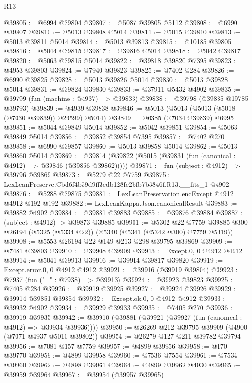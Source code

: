 \begin{lexlean}{R13}
\begin{coremodule}
@39805 := @6994 @39804
@39807 := @5087 @39805 @5112
@39808 := @6990 @39807
@39810 := @5013 @39808 @5014
@39811 := @5015 @39810
@39813 := @5013 @39811 @5014
@39814 := @5013 @39813
@39815 := @10185 @39805
@39816 := @5044 @39815
@39817 := @39816 @5014
@39818 := @5042 @39817
@39820 := @5063 @39815 @5014
@39822 := @39818 @39820 @7395
@39823 := @4953 @39803
@39824 := @7940 @39823
@39825 := @7402 @284
@39826 := @6990 @39825
@39828 := @5013 @39826 @5014
@39830 := @5013 @39828 @5014
@39831 := @39824 @39830
@39833 := @37911 @5432 @4902
@39835 := @39799 (fun (machine : @4937) => @39833)
@39838 := @39798 (@39835 @19785 @39793)
@39839 := @4939 @39838
@39846 := @5013 (@5013 (@5013 (@5018 (@7030 @39839)) @26599) @5014)
@39849 := @6385 (@7034 @39839) @6995
@39851 := @5044 @39849 @5014
@39852 := @5042 @39851
@39854 := @5063 @39849 @5014
@39856 := @39852 @39854 @7395
@39857 := @7402 @270
@39858 := @6990 @39857
@39860 := @5013 @39858 @5014
@39862 := @5013 @39860 @5014
@39869 := @39814 (@39822 (@5015 (@39831 (fun (canonical : @4912) => @39846 (@39856 @39862)))))
@39871 := fun (subject : @4912) => @39796 @39869
@39873 := @5279 @22 @7759
@39875 := LexLeanPreserve.Cbd6f4b39d9ff3edb128fe2bfb7b3846f.R13.__fits_1 @4902
@39876 := @5288 @39875
@39881 := LexLeanPreservation.encExcept @4912 @4912 @192 @192
@39882 := LexLeanKappa.Json.canonicalResult
@39883 := @39882 @4902
@39884 := @39881 @39883
@39885 := @39876 @39884
@39887 := (subject : @4912) -> @39873 @39885
@39901 := @5302
    @22
    @7759
    @39885
    @300
    @26194
    (@5325 (@5334 @22))
    (@5340 (@5341 (@5342 @300) @7759 @5319))
@39908 := @5553 @26194 @22 @149 @213 @298 @39795 @39869
@39909 := @7481 @39803
@39910 := @39908 @39909
@39913 := Except.{0, 0} @4912 @4912
@39914 := @5041 @39913
@39916 := @39914 @39817 @39820
@39919 := Except.error.{0, 0} @4912 @4912
@39921 := @39916 (@39919 @39804)
@39923 := @7937 (fun ("_" : @7938) => @39913)
@39924 := @39923 @39823
@39925 := @7405 @284
@39926 := @39919 @39925
@39927 := @39924 @39926
@39929 := @39914 @39851 @39854
@39932 := Except.ok.{0, 0} @4912 @4912
@39933 := @39932 @4902
@39934 := @39929 @39933
@39935 := @7405 @270
@39936 := @39919 @39935
@39942 := @39910 (@39881 (@39921 (@39927 (fun (canonical : @4912) => @39934 @39936))))
@39950 := @26269 @212 @39795 @39909 (@4900 (@7071 @4937 @5010 @39802))
@39954 := @26279 @127 @211 @39782 @39794
@39956 := @7081 @157 @7759
@39957 := @4899 @39956
@39958 := @170 @39770
@39959 := @4899 @39958
@39960 := @7536 @7554
@39961 := @7534 @39960
@39962 := @4898 @39961
@39964 := @4899 @39962 @4930
@39965 := @39959 @39964
@39967 := @39954 (@39957 @39965)

\end{coremodule}
\end{lexlean}
